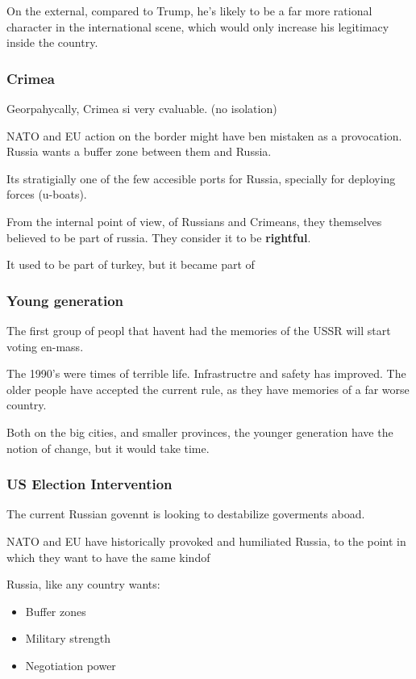 On the external, compared to Trump, he's likely to be a far more rational character in the international scene, which would only increase his legitimacy inside the country.


\subsubsection{Crimea}

Georpahycally, Crimea si very cvaluable. (no isolation)

NATO and EU action on the border might have ben mistaken as a provocation. Russia wants a buffer zone between them and Russia.

Its stratigially one of the few accesible ports for Russia, specially for deploying forces (u-boats).

From the internal point of view, of Russians and Crimeans, they themselves believed to be part of russia. They consider it to be \textbf{rightful}.

It used to be part of turkey, but it became part of 


\subsubsection{Young generation}

The first group of peopl that havent had the memories of the USSR will start voting en-mass.

The 1990's were times of terrible life. Infrastructre and safety has improved. The older people have accepted the current rule, as they have memories of a far worse country.

Both on the big cities, and smaller provinces, the younger generation have the notion of change, but it would take time.


\subsubsection{US Election Intervention} 

The current Russian govennt is looking to destabilize goverments aboad. 

NATO and EU have historically provoked and humiliated Russia, to the point in which they want to have the same kindof 

Russia, like any country wants:
\begin{itemize}
	\item Buffer zones
	\item Military strength
	\item Negotiation power
\end{itemize}

